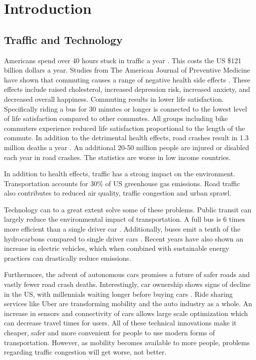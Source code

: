 \chapter{Introduction}

\section{Traffic and Technology}


Americans spend over 40 hours stuck in traffic a year \cite{traffic}.
This costs the US \$121 billion dollars a year.
Studies from The American Journal of Preventive Medicine have shown that commuting causes a range of negative health side effects \cite{trafficandhealth}.
These effects include raised cholesterol, increased depression risk, increased anxiety, and decreased overall happiness.
Commuting results in lower life satisfaction.
Specifically riding a bus for 30 minutes or longer is connected to the lowest level of life satisfaction compared to other commutes.
All groups including bike commuters experience reduced life satisfaction proportional to the length of the commute.
In addition to the detrimental health effects, road crashes result in 1.3 million deaths a year \cite{trafficdeaths}.
An additional 20-50 million people are injured or disabled each year in road crashes.
The statistics are worse in low income countries.


In addition to health effects, traffic has a strong impact on the environment.
Transportation accounts for 30\% of US greenhouse gas emissions.
Road traffic also contributes to reduced air quality, traffic congestion and urban sprawl.


Technology can to a great extent solve some of these problems.
Public transit can largely reduce the environmental impact of transportation.
A full bus is 6 times more efficient than a single driver car \cite{trafficenv}.
Additionally, buses emit a tenth of the hydrocarbons compared to single driver cars \cite{trafficenv}.
Recent years have also shown an increase in electric vehicles, which when combined with sustainable energy practices can drastically reduce emissions.

Furthermore, the advent of autonomous cars promises a future of safer roads and vastly fewer road crash deaths.
Interestingly, car ownership shows signs of decline in the US, with millennials waiting longer before buying cars \cite{cars}.
Ride sharing services like Uber are transforming mobility and the auto industry as a whole.
An increase in sensors and connectivity of cars allows large scale optimization which can decrease travel times for users.
All of these technical innovations make it cheaper, safer and more convenient for people to use modern forms of transportation.
However, as mobility becomes available to more people, problems regarding traffic congestion will get worse, not better.

